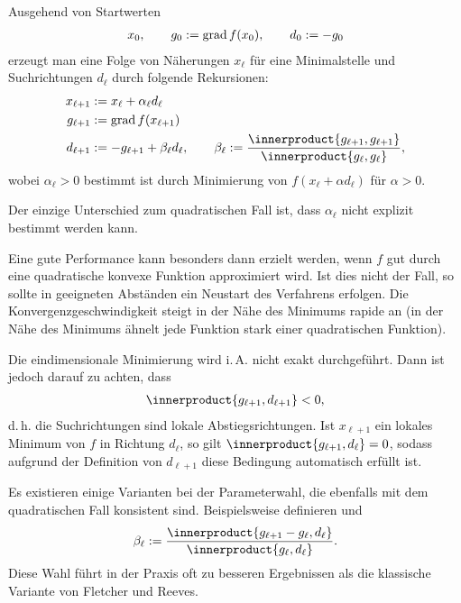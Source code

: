 Ausgehend von Startwerten
\begin{align*}
    x_0, \qquad
    g_0 := \operatorname{grad} f(x_0), \qquad
    d_0 := -g_0
\end{align*}
erzeugt man eine Folge von Näherungen $x_\ell$ für eine Minimalstelle und
Suchrichtungen $d_\ell$ durch folgende Rekursionen:
\begin{align*}
    x_{\ell+1} & := x_\ell + \alpha_\ell d_\ell \\
    g_{\ell+1} & := \grad f(x_{\ell+1}) \\
    d_{\ell+1} & := -g_{\ell+1} + \beta_\ell d_\ell, \qquad
    \beta_\ell := \frac{\innerproduct{g_{\ell+1}, g_{\ell+1}}}{\innerproduct{g_\ell, g_\ell}},
\end{align*}
wobei $\alpha_\ell > 0$ bestimmt ist durch Minimierung von
$f(x_\ell + \alpha d_\ell)$ für $\alpha > 0$.

Der einzige Unterschied zum quadratischen Fall ist, dass $\alpha_\ell$ nicht
explizit bestimmt werden kann.

\linie

Eine gute Performance kann besonders dann erzielt werden, wenn $f$ gut durch
eine quadratische konvexe Funktion approximiert wird.
Ist dies nicht der Fall, so sollte in geeigneten Abständen ein Neustart
des Verfahrens erfolgen.
Die Konvergenzgeschwindigkeit steigt in der Nähe des Minimums rapide an
(in der Nähe des Minimums ähnelt jede Funktion stark einer quadratischen
Funktion).

\linie

Die eindimensionale Minimierung wird i.\,A. nicht exakt durchgeführt.
Dann ist jedoch darauf zu achten, dass
\begin{align*}
    \innerproduct{g_{\ell+1}, d_{\ell+1}} < 0,
\end{align*}
d.\,h. die Suchrichtungen sind lokale Abstiegsrichtungen.
Ist $x_{\ell+1}$ ein lokales Minimum von $f$ in Richtung $d_\ell$, so gilt
$\innerproduct{g_{\ell+1}, d_\ell} = 0$, sodass aufgrund der Definition von
$d_{\ell+1}$ diese Bedingung automatisch erfüllt ist.

\linie

Es existieren einige Varianten bei der Parameterwahl, die ebenfalls mit dem
quadratischen Fall konsistent sind.
Beispielsweise definieren  und 
\begin{align*}
    \beta_\ell := \frac{\innerproduct{g_{\ell+1} - g_\ell, d_\ell}}{\innerproduct{g_\ell, d_\ell}}.
\end{align*}
Diese Wahl führt in der Praxis oft zu besseren Ergebnissen als die klassische
Variante von Fletcher und Reeves.

